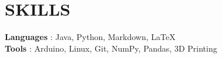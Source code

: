 \section{SKILLS}
\begin{itemize}[leftmargin=0in, label={}]
    \small{\item{
                    \textbf{Languages} {: Java, Python, Markdown, \LaTeX }\vspace{2pt} \\
                    \textbf{Tools} {: Arduino, Linux, Git, NumPy, Pandas, 3D Printing}              }}
\end{itemize}
